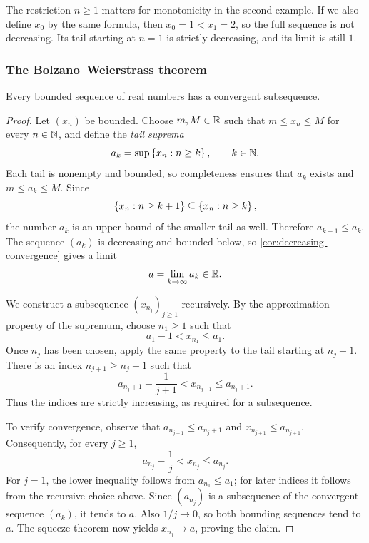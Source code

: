 \documentclass[11pt,a4paper]{amsart}
\begin{document}
\begin{remark}
  The restriction \(n\geq1\) matters for monotonicity in the second
  example. If we also define \(x_0\) by the same formula, then
  \(x_0=1<x_1=2\), so the full sequence is not decreasing. Its tail
  starting at \(n=1\) is strictly decreasing, and its limit is still \(1\).
\end{remark}

\subsubsection{The Bolzano--Weierstrass theorem}

\begin{theorem}
  Every bounded sequence of real numbers has a convergent subsequence.
\end{theorem}

\begin{proof}
  Let \((x_n)\) be bounded. Choose \(m,M\in\mathbb{R}\) such that
  \(m\leq x_n\leq M\) for every \(n\in\mathbb{N}\), and define the
  \emph{tail suprema}
  \[
    a_k=\sup\left\lbrace x_n:n\geq k\right\rbrace,\qquad k\in\mathbb{N}.
  \]
  Each tail is nonempty and bounded, so completeness ensures that
  \(a_k\) exists and \(m\leq a_k\leq M\). Since
  \[
    \left\lbrace x_n:n\geq k+1\right\rbrace\subseteq\left\lbrace x_n:n\geq k\right\rbrace,
  \]
  the number \(a_k\) is an upper bound of the smaller tail as well.
  Therefore \(a_{k+1}\leq a_k\). The sequence \((a_k)\) is decreasing
  and bounded below, so \cref{cor:decreasing-convergence} gives a limit
  \[
    a=\lim_{k\to\infty}a_k\in\mathbb{R}.
  \]

  We construct a subsequence \((x_{n_j})_{j\geq1}\) recursively.
  By the approximation property of the supremum, choose \(n_1\geq1\)
  such that
  \[
    a_1-1<x_{n_1}\leq a_1.
  \]
  Once \(n_j\) has been chosen, apply the same property to the tail
  starting at \(n_j+1\). There is an index \(n_{j+1}\geq n_j+1\)
  such that
  \[
    a_{n_j+1}-\frac{1}{j+1}<x_{n_{j+1}}\leq a_{n_j+1}.
  \]
  Thus the indices are strictly increasing, as required for a subsequence.

  To verify convergence, observe that
  \(a_{n_{j+1}}\leq a_{n_j+1}\) and
  \(x_{n_{j+1}}\leq a_{n_{j+1}}\). Consequently, for every \(j\geq1\),
  \[
    a_{n_j}-\frac{1}{j}<x_{n_j}\leq a_{n_j}.
  \]
  For \(j=1\), the lower inequality follows from
  \(a_{n_1}\leq a_1\); for later indices it follows from the recursive
  choice above. Since \((a_{n_j})\) is a subsequence of the convergent
  sequence \((a_k)\), it tends to \(a\). Also \(1/j\to0\), so both
  bounding sequences tend to \(a\). The squeeze theorem now yields
  \(x_{n_j}\to a\), proving the claim.
\end{proof}
\end{document}
